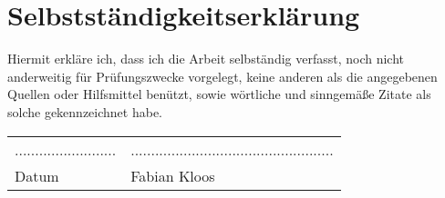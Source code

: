\chapter*{Selbstständigkeitserklärung}
Hiermit erkläre ich, dass ich die Arbeit selbständig verfasst, noch nicht anderweitig für Prüfungszwecke vorgelegt, keine anderen als die angegebenen Quellen oder Hilfsmittel benützt, sowie wörtliche und sinngemäße Zitate als solche gekennzeichnet habe.

\vspace{2cm}

\begin{tabular}{@{}ll@{}}
......................... &  .................................................. \\
Datum                     &  Fabian Kloos
\end{tabular}
